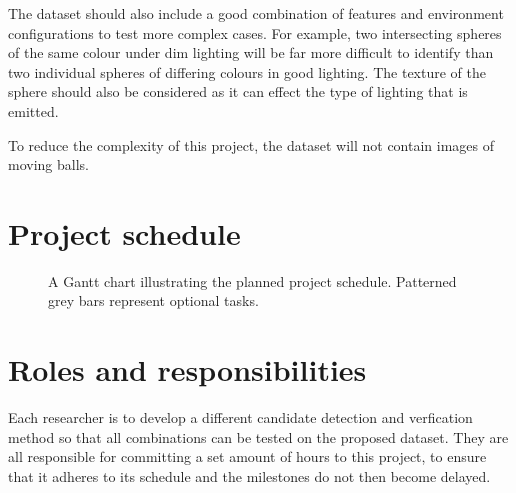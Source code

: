 \documentclass[11pt]{scrartcl}
\begin{document}
{{        	The dataset should also include a good combination of features and
        	environment configurations to test more complex cases. For example, two
        	intersecting spheres of the same colour under dim lighting will be far 
        	more difficult to identify than two individual spheres of differing
        	colours in good lighting. The texture of the sphere should also be
        	considered as it can effect the type of lighting that is emitted.


            To reduce the complexity of this project, the dataset will not contain
            images of moving balls.

        }

	}

	\section{Project schedule} {


		\begin{figure}[H]
	        \makebox[\textwidth][c]{\resizebox{0.95\paperwidth}{!}{}}
			\caption[Project Schedule] {
                A Gantt chart illustrating the planned project schedule.
                Patterned grey bars represent optional tasks.
			}
			\label{gantt:proposal}
		\end{figure}

	}

	\section{Roles and responsibilities} {

		Each researcher is to develop a different candidate detection and
		verfication method so that all combinations can be tested on the 
		proposed dataset. They are all responsible for committing a set 
		amount of hours to this project, to ensure that it adheres to its
		schedule and the milestones do not then become delayed.

    }
\end{document}
